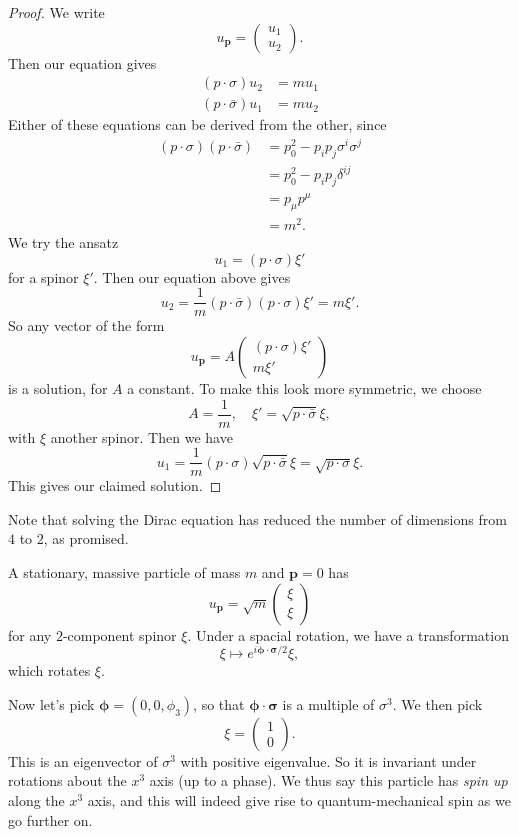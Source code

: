 \documentclass[a4paper]{article}
\begin{document}
\begin{proof}
  We write
  \[
    u_\mathbf{p} =
    \begin{pmatrix}
      u_1\\
      u_2
    \end{pmatrix}.
  \]
  Then our equation gives
  \begin{align*}
    (p\cdot \sigma) u_2 &= m u_1\\
    (p \cdot \bar\sigma) u_1 &= m u_2
  \end{align*}
  Either of these equations can be derived from the other, since
  \begin{align*}
    (p \cdot \sigma)(p \cdot \bar\sigma) &= p_0^2 - p_i p_j \sigma^i \sigma^j\\
    &= p_0^2 - p_i p_j \delta^{ij}\\
    &= p_\mu p^\mu \\
    &= m^2.
  \end{align*}
  We try the ansatz
  \[
    u_1 = (p \cdot \sigma) \xi'
  \]
  for a spinor $\xi'$. Then our equation above gives
  \[
    u_2 = \frac{1}{m} (p \cdot \bar\sigma)(p \cdot \sigma) \xi' = m \xi'.
  \]
  So any vector of the form
  \[
    u_\mathbf{p} = A
    \begin{pmatrix}
     (p \cdot \sigma) \xi'\\
     m \xi'
    \end{pmatrix}
  \]
  is a solution, for $A$ a constant. To make this look more symmetric, we choose
  \[
    A = \frac{1}{m},\quad \xi' = \sqrt{p \cdot \bar\sigma} \xi,
  \]
  with $\xi$ another spinor. Then we have
  \[
    u_1 = \frac{1}{m} (p\cdot \sigma)\sqrt{p \cdot \bar\sigma} \xi = \sqrt{p \cdot \sigma} \xi.
  \]
  This gives our claimed solution.
\end{proof}

Note that solving the Dirac equation has reduced the number of dimensions from $4$ to $2$, as promised.

\begin{eg}
  A stationary, massive particle of mass $m$ and $\mathbf{p} = 0$ has
  \[
    u_\mathbf{p} = \sqrt{m}
    \begin{pmatrix}
      \xi\\ \xi
    \end{pmatrix}
  \]
  for any $2$-component spinor $\xi$. Under a spacial rotation, we have a transformation
  \[
    \xi \mapsto e^{i \boldsymbol \phi\cdot \boldsymbol\sigma/2} \xi,
  \]
  which rotates $\xi$.

  Now let's pick $\boldsymbol\phi = (0, 0, \phi_3)$, so that $\boldsymbol\phi \cdot \boldsymbol\sigma$ is a multiple of $\sigma^3$. We then pick
   \[
    \xi =
    \begin{pmatrix}
      1 \\0
    \end{pmatrix}.
  \]
  This is an eigenvector of $\sigma^3$ with positive eigenvalue. So it is invariant under rotations about the $x^3$ axis (up to a phase). We thus say this particle has \emph{spin up} along the $x^3$ axis, and this will indeed give rise to quantum-mechanical spin as we go further on.
\end{eg}
\end{document}
